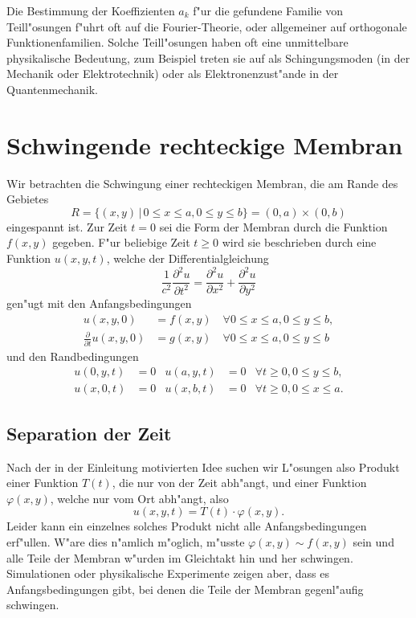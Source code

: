 Die Bestimmung der Koeffizienten $a_k$ f"ur die gefundene Familie
von Teill"osungen f"uhrt oft auf die Fourier-Theorie, oder allgemeiner
auf orthogonale Funktionenfamilien. Solche Teill"osungen haben oft eine
unmittelbare physikalische Bedeutung, zum Beispiel treten sie auf als
Schingungsmoden (in der Mechanik oder Elektrotechnik) oder als
Elektronenzust"ande in der Quantenmechanik.

\section{Schwingende rechteckige Membran}
Wir betrachten die Schwingung einer rechteckigen Membran, die am Rande
des Gebietes
\[
R=\{(x,y)\,|\,0\le x\le a,0\le y\le b\} =(0,a)\times(0,b)
\]
eingespannt ist. Zur Zeit $t=0$ sei die Form der Membran durch die
Funktion $f(x,y)$ gegeben.
F"ur beliebige Zeit $t\ge 0$ wird sie beschrieben durch eine Funktion $u(x,y,t)$,
welche der Differentialgleichung
\[
\frac1{c^2}\frac{\partial^2u}{\partial t^2}=\frac{\partial^2u}{\partial x^2}+\frac{\partial^2u}{\partial y^2}
\]
gen"ugt mit den Anfangsbedingungen
\begin{align*}
u(x,y,0)&=f(x,y)\quad\forall 0\le x\le a,0\le y\le b,
\\
\frac{\partial}{\partial t}u(x,y,0)&=g(x,y)\quad\forall 0\le x\le a,0\le y\le b
\end{align*}
und den Randbedingungen
\begin{align*}
u(0,y,t)&=0&u(a,y,t)&=0&\forall t\ge 0,0\le y\le b,\\
u(x,0,t)&=0&u(x,b,t)&=0&\forall t\ge 0,0\le x\le a.
\end{align*}

\subsection{Separation der Zeit}
Nach der in der Einleitung motivierten Idee suchen wir L"osungen also
Produkt einer Funktion $T(t)$, die nur von der Zeit abh"angt, und einer Funktion
$\varphi(x,y)$, welche nur vom Ort abh"angt, also
\[
u(x,y,t)=T(t)\cdot\varphi(x,y).
\]
Leider kann ein einzelnes solches Produkt nicht alle Anfangsbedingungen
erf"ullen. W"are dies n"amlich m"oglich, m"usste $\varphi(x,y)\sim f(x,y)$
sein und alle Teile der Membran w"urden im Gleichtakt hin und her schwingen.
Simulationen oder physikalische Experimente zeigen aber, dass es
Anfangsbedingungen gibt, bei denen die Teile der Membran gegenl"aufig
schwingen.

